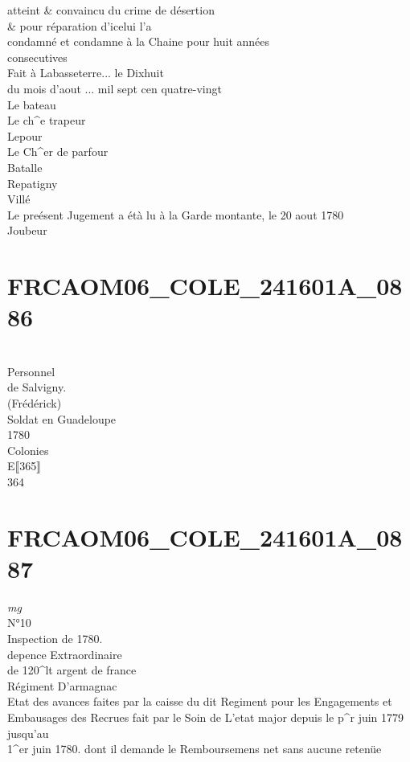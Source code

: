 \documentclass{article}
\begin{document}
\begin{pages}
atteint \& convaincu du crime de désertion\\
\& pour réparation d'icelui l'a\\
condamné et condamne à la Chaine pour huit années\\
consecutives\\
Fait à Labasseterre... le Dixhuit\\
du mois d'aout ... mil sept cen quatre-vingt\\
Le bateau\\
Le ch\^{}e trapeur\\
Lepour\\
Le Ch\^{}er de parfour\\
Batalle\\
Repatigny\\
Villé\\
Le preésent Jugement a étà lu à la Garde montante, le 20 aout 1780\\
Joubeur
\pend
\endnumbering\beginnumbering\section{FRCAOM06\_COLE\_241601A\_0886}\pstart
\\
Personnel\\
de Salvigny.\\
(Frédérick)\\
Soldat en Guadeloupe\\
1780\\
Colonies\\
E⟦365⟧\\
364
\pend
\endnumbering\beginnumbering\section{FRCAOM06\_COLE\_241601A\_0887}
\vspace{0.5cm}\noindent
\textit{mg}
\footnotesize \\
N°10\\
Inspection de 1780.\\
depence Extraordinaire\\
de 120\^{}lt argent de france
\normalsize \pstart
\\
Régiment D'armagnac\\
Etat des avances faites par la caisse du dit Regiment pour les Engagements et\\
Embausages des Recrues fait par le Soin de L'etat major depuis le p\^{}r juin 1779 jusqu'au\\
1\^{}er juin 1780. dont il demande le Remboursemens net sans aucune retenüe\\

\end{pages}
\end{document}
